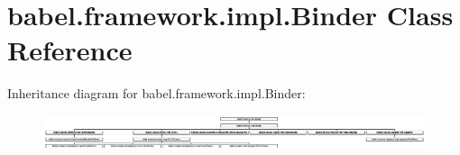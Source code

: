\hypertarget{classbabel_1_1framework_1_1impl_1_1_binder}{\section{babel.\-framework.\-impl.\-Binder Class Reference}
\label{classbabel_1_1framework_1_1impl_1_1_binder}
}
Inheritance diagram for babel.\-framework.\-impl.\-Binder\-:\begin{figure}[H]
\begin{center}
\leavevmode
\includegraphics[height=1.015229cm]{classbabel_1_1framework_1_1impl_1_1_binder}
\end{center}
\end{figure}
